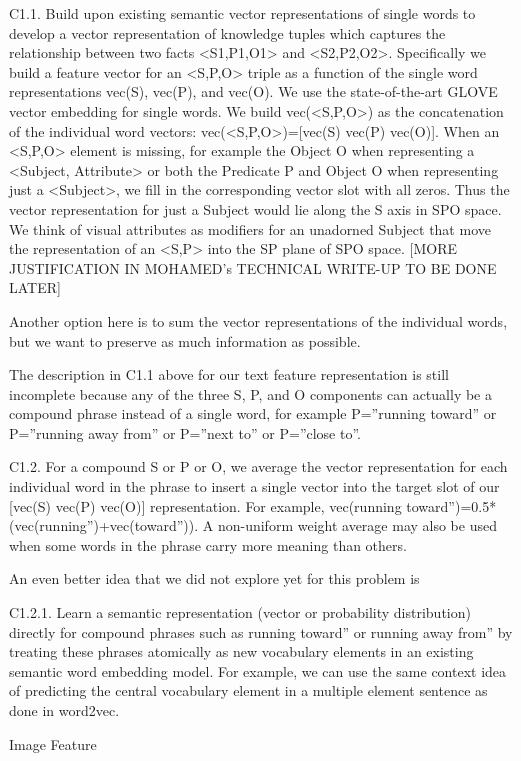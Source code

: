\documentclass[runningheads]{llncs}
\begin{document}
C1.1. Build upon existing semantic vector representations of single words to develop a vector representation of knowledge tuples which captures the relationship between two facts <S1,P1,O1> and <S2,P2,O2>. Specifically we build a feature vector for an <S,P,O> triple as a function of  the single word representations vec(S), vec(P), and vec(O). We use the state-of-the-art GLOVE vector embedding for single words. We build vec(<S,P,O>) as the concatenation of the individual word vectors: vec(<S,P,O>)=[vec(S) vec(P) vec(O)]. When an <S,P,O> element is missing, for example the Object O when representing a <Subject, Attribute> or both the Predicate P and Object O when representing just a <Subject>, we fill in the corresponding vector slot with all zeros. Thus the vector representation for just a Subject would lie along the S axis in SPO space. We think of visual attributes as modifiers for an unadorned Subject that move the representation of an <S,P> into the SP plane of SPO space. [MORE JUSTIFICATION IN MOHAMED’s TECHNICAL WRITE-UP TO BE DONE LATER]


Another option here is to sum the vector representations of the individual words, but we want to preserve as much information as possible.


The description in C1.1 above for our text feature representation is still incomplete because any of the three S, P, and O components can actually be a compound phrase instead of a single word, for example P=”running toward” or P=”running away from” or P=”next to” or P=”close to”.


C1.2. For a compound S or P or O, we average the vector representation for each individual word in the phrase to insert a single vector into the target slot of our [vec(S) vec(P) vec(O)] representation. For example, vec(running toward”)=0.5*(vec(running”)+vec(toward”)). A non-uniform weight average may also be used when some words in the phrase carry more meaning than others.


An even better idea that we did not explore yet for this problem is


C1.2.1. Learn a semantic representation (vector or probability distribution) directly for compound phrases such as running toward” or running away from” by treating these phrases atomically as new vocabulary elements in an existing semantic word embedding model. For example, we can use the same context idea of predicting the central vocabulary element in a multiple element sentence as done in word2vec.


Image Feature
\end{document}
